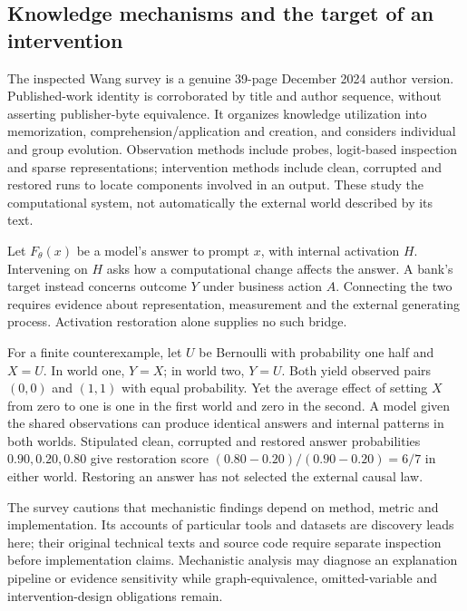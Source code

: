 \subsection{Knowledge mechanisms and the target of an intervention}
The inspected Wang survey is a genuine 39-page December 2024 author version. Published-work identity is corroborated by title and author sequence, without asserting publisher-byte equivalence. It organizes knowledge utilization into memorization, comprehension/application and creation, and considers individual and group evolution. Observation methods include probes, logit-based inspection and sparse representations; intervention methods include clean, corrupted and restored runs to locate components involved in an output. These study the computational system, not automatically the external world described by its text.~\citep{exec24_knowledge_original}

Let $F_\theta(x)$ be a model's answer to prompt $x$, with internal activation $H$. Intervening on $H$ asks how a computational change affects the answer. A bank's target instead concerns outcome $Y$ under business action $A$. Connecting the two requires evidence about representation, measurement and the external generating process. Activation restoration alone supplies no such bridge.~\citep{exec24_css_knowledge_reference}

For a finite counterexample, let $U$ be Bernoulli with probability one half and $X=U$. In world one, $Y=X$; in world two, $Y=U$. Both yield observed pairs $(0,0)$ and $(1,1)$ with equal probability. Yet the average effect of setting $X$ from zero to one is one in the first world and zero in the second. A model given the shared observations can produce identical answers and internal patterns in both worlds. Stipulated clean, corrupted and restored answer probabilities $0.90,0.20,0.80$ give restoration score $(0.80-0.20)/(0.90-0.20)=6/7$ in either world. Restoring an answer has not selected the external causal law.~\citep{exec24_css_knowledge_reference}

The survey cautions that mechanistic findings depend on method, metric and implementation. Its accounts of particular tools and datasets are discovery leads here; their original technical texts and source code require separate inspection before implementation claims. Mechanistic analysis may diagnose an explanation pipeline or evidence sensitivity while graph-equivalence, omitted-variable and intervention-design obligations remain.~\citep{exec24_knowledge_original,exec24_css_knowledge_reference}

